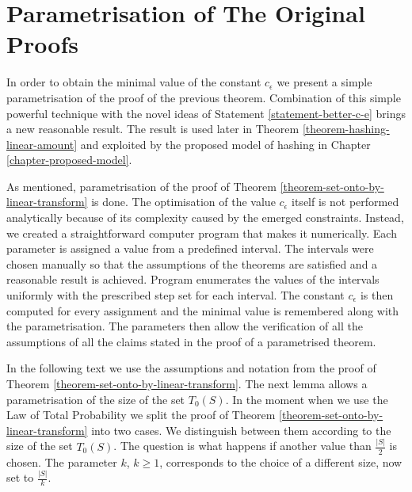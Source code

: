 \section{Parametrisation of The Original Proofs}
In order to obtain the minimal value of the constant $c_\epsilon$ we present a simple parametrisation of the proof of the previous theorem. Combination of this simple powerful technique with the novel ideas of Statement \ref{statement-better-c-e} brings a new reasonable result. The result is used later in Theorem \ref{theorem-hashing-linear-amount} and exploited by the proposed model of hashing in Chapter \ref{chapter-proposed-model}.

As mentioned, parametrisation of the proof of Theorem \ref{theorem-set-onto-by-linear-transform} is done. The optimisation of the value $c_\epsilon$ itself is not performed analytically because of its complexity caused by the emerged constraints. Instead, we created a straightforward computer program that makes it numerically. Each parameter is assigned a value from a predefined interval. The intervals were chosen manually so that the assumptions of the theorems are satisfied and a reasonable result is achieved. Program enumerates the values of the intervals uniformly with the prescribed step set for each interval. The constant $c_\epsilon$ is then computed for every assignment and the minimal value is remembered along with the parametrisation. The parameters then allow the verification of all the assumptions of all the claims stated in the proof of a parametrised theorem.

In the following text we use the assumptions and notation from the proof of Theorem \ref{theorem-set-onto-by-linear-transform}. The next lemma allows a parametrisation of the size of the set $T_0(S)$. In the moment when we use the Law of Total Probability we split the proof of Theorem \ref{theorem-set-onto-by-linear-transform} into two cases. We distinguish between them according to the size of the set $T_0(S)$. The question is what happens if another value than $\frac{|S|}{2}$ is chosen. The parameter $k$, $k \geq 1$, corresponds to the choice of a different size, now set to $\frac{|S|}{k}$.

